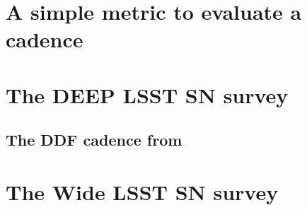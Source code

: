 \documentclass[\docopts]{\docclass}
\begin{document}

\section{A simple metric to evaluate a cadence}
\label{sec:methods}




% 



\section{The DEEP LSST SN survey}

\subsection{The DDF cadence from }
\label{sec:results}




\section{The Wide LSST SN survey}
\end{document}
